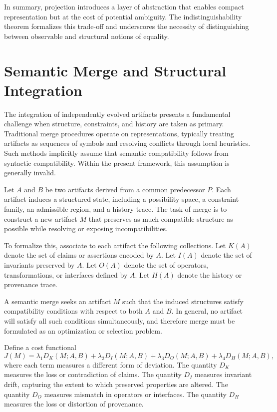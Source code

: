 \documentclass[11pt,oneside]{article}
\begin{document}
In summary, projection introduces a layer of abstraction that enables compact representation but at the cost of potential ambiguity. The indistinguishability theorem formalizes this trade-off and underscores the necessity of distinguishing between observable and structural notions of equality.

\section{Semantic Merge and Structural Integration}

The integration of independently evolved artifacts presents a fundamental challenge when structure, constraints, and history are taken as primary. Traditional merge procedures operate on representations, typically treating artifacts as sequences of symbols and resolving conflicts through local heuristics. Such methods implicitly assume that semantic compatibility follows from syntactic compatibility. Within the present framework, this assumption is generally invalid.

Let \( A \) and \( B \) be two artifacts derived from a common predecessor \( P \). Each artifact induces a structured state, including a possibility space, a constraint family, an admissible region, and a history trace. The task of merge is to construct a new artifact \( M \) that preserves as much compatible structure as possible while resolving or exposing incompatibilities.

To formalize this, associate to each artifact the following collections. Let \( K(A) \) denote the set of claims or assertions encoded by \( A \). Let \( I(A) \) denote the set of invariants preserved by \( A \). Let \( O(A) \) denote the set of operators, transformations, or interfaces defined by \( A \). Let \( H(A) \) denote the history or provenance trace.

A semantic merge seeks an artifact \( M \) such that the induced structures satisfy compatibility conditions with respect to both \( A \) and \( B \). In general, no artifact will satisfy all such conditions simultaneously, and therefore merge must be formulated as an optimization or selection problem.

Define a cost functional
\[
J(M) = \lambda_1 D_K(M; A, B) + \lambda_2 D_I(M; A, B) + \lambda_3 D_O(M; A, B) + \lambda_4 D_H(M; A, B),
\]
where each term measures a different form of deviation. The quantity \( D_K \) measures the loss or contradiction of claims. The quantity \( D_I \) measures invariant drift, capturing the extent to which preserved properties are altered. The quantity \( D_O \) measures mismatch in operators or interfaces. The quantity \( D_H \) measures the loss or distortion of provenance.
\end{document}
